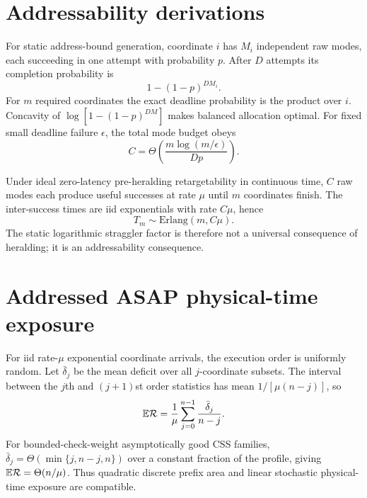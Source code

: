 \documentclass[aps,prx,preprint,superscriptaddress,nofootinbib,longbibliography]{revtex4-2}
\begin{document}
\section{Addressability derivations}
For static address-bound generation, coordinate $i$ has $M_i$ independent raw modes, each succeeding in one attempt with probability $p$. After $D$ attempts its completion probability is
\begin{equation}
1-(1-p)^{DM_i}.
\end{equation}
For $m$ required coordinates the exact deadline probability is the product over $i$. Concavity of $\log[1-(1-p)^{DM}]$ makes balanced allocation optimal. For fixed small deadline failure $\epsilon$, the total mode budget obeys
\begin{equation}
C=\Theta\left(\frac{m\log(m/\epsilon)}{Dp}\right).
\end{equation}

Under ideal zero-latency pre-heralding retargetability in continuous time, $C$ raw modes each produce useful successes at rate $\mu$ until $m$ coordinates finish. The inter-success times are iid exponentials with rate $C\mu$, hence
\begin{equation}
T_m\sim\mathrm{Erlang}(m,C\mu).
\end{equation}
The static logarithmic straggler factor is therefore not a universal consequence of heralding; it is an addressability consequence.

\section{Addressed ASAP physical-time exposure}
For iid rate-$\mu$ exponential coordinate arrivals, the execution order is uniformly random. Let $\bar\delta_j$ be the mean deficit over all $j$-coordinate subsets. The interval between the $j$th and $(j+1)$st order statistics has mean $1/[\mu(n-j)]$, so
\begin{equation}
\mathbb E\mathcal R=\frac1\mu\sum_{j=0}^{n-1}\frac{\bar\delta_j}{n-j}.
\end{equation}
For bounded-check-weight asymptotically good CSS families, $\bar\delta_j=\Theta(\min\{j,n-j,n\})$ over a constant fraction of the profile, giving $\mathbb E\mathcal R=\Theta(n/\mu)$. Thus quadratic discrete prefix area and linear stochastic physical-time exposure are compatible.
\end{document}
